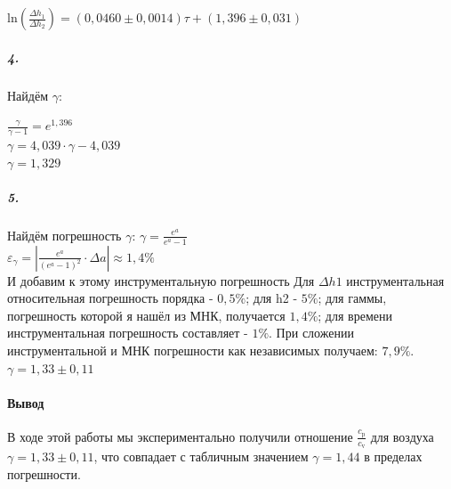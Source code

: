 \documentclass[a4paper,12pt]{article}
\begin{document}
$\text{ln}(\frac{\Delta h_1}{\Delta h_2}) = (0,0460 \pm 0,0014)\tau + (1,396 \pm 0,031)$
\subparagraph{4.} Найдём $\gamma$: 
\begin{center}
    $\frac{\gamma}{\gamma - 1}= e^{1,396}$\\
    $\gamma = 4,039\cdot \gamma - 4,039$\\
    $\gamma = 1,329$
\end{center}
\subparagraph{5.} Найдём погрешность $\gamma$: $\gamma = \frac{e^a}{e^a - 1}$ \\
$\varepsilon_\gamma = |\frac{e^a}{(e^a - 1)^2}\cdot \Delta a| \approx 1,4\%$\\
И добавим к этому инструментальную погрешность Для $\Delta h1$ инструментальная относительная погрешность порядка - $0,5\%$; для h2 - $5\%$; для гаммы, погрешность которой я нашёл из МНК, получается $1,4\%$; для времени инструментальная погрешность составляет - $1\%$. При сложении инструментальной и МНК погрешности как независимых получаем: $7,9\%$. \\
$\gamma = 1,33 \pm 0,11$
\paragraph{Вывод \\}
В ходе этой работы мы экспериментально получили отношение $\frac{c_\text{p}}{c_\text{v}}$ для воздуха $\gamma = 1,33\pm 0,11$, что совпадает с табличным значением $\gamma = 1,44$ в пределах погрешности. 
\end{document}

